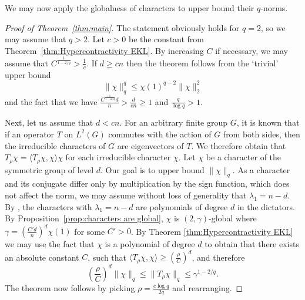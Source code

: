 \documentclass[11pt, letterpaper]{amsart}
\renewcommand\ge{\geqslant}
\renewcommand\le{\leqslant}
\begin{document}
We may now apply the globalness of characters to upper bound their $q$-norms.
    
\begin{proof}[Proof of Theorem~\ref{thm:main}]
The statement obviously holds for $q=2$, so we may assume that $q > 2$. Let $c>0$ be the constant from Theorem~\ref{thm:Hypercontractivity EKL}. By increasing $C$ if necessary, we may assume that $C^{\frac{1}{1-2/q}} >\frac{1}{c}$. If $d \ge cn$ then the theorem follows from the `trivial' upper bound   
\[\|\chi\|_q^q \le \chi(1)^{q-2}\|\chi\|_2^2\] and the fact that we have $\frac{C^{\frac{1}{1-2/q}}d}{n}>\frac{d}{cn}\ge 1$ and $\frac{q}{\log q} > 1$.

Next, let us assume that $d < cn$. For an arbitrary finite group $G$, it is known that if an operator $T$ on $L^2(G)$ commutes with the action of $G$ from both sides, then the irreducible characters of $G$ are eigenvectors of $T$. We therefore obtain that $T_{\rho}\chi = \langle T_{\rho}\chi, \chi\rangle \chi$ for each irreducible character $\chi.$ Let $\chi$ be a character of the symmetric group of level $d$. Our goal is to upper bound $\|\chi\|_q.$ As a character and its conjugate differ only by multiplication by the sign function, which does not affect the norm, we may assume without loss of generality that $\lambda_1=n-d.$
By \cite[Theorem 7]{ellis2011intersecting}, the characters with $\lambda_1=n-d$ are polynomials of degree $d$ in the dictators. %
By Proposition~\ref{prop:characters are global}, $\chi$ is $(2,\gamma)$-global where $\gamma = \left(\frac{C'd}{n}\right)^d\chi(1)$ for some $C'>0$. By Theorem \ref{thm:Hypercontractivity EKL} we may use the fact that $\chi$ is a polynomial of degree $d$ to obtain that there exists an absolute constant $C$, such that $\langle T_{\rho} \chi,\chi \rangle \ge \left(\frac{\rho}{C}\right)^d$, and therefore 
\[
\left(\frac{\rho}{C}\right)^d\|\chi\|_q \le \|T_{\rho}\chi \|_q \le \gamma^{1-2/q}.
\]
The theorem now follows by picking $\rho = \frac{c\log q}{2q}$ and rearranging.
\end{proof}
\end{document}
